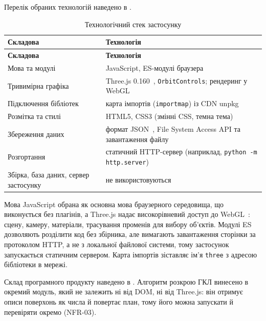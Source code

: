 
Перелік обраних технологій наведено в .

\begin{spacing}{1.15}
\small\noindent
\begin{xltabular}{\textwidth}{| >{\raggedright\arraybackslash}p{4.4cm} | >{\raggedright\arraybackslash}X |}
    \caption{Технологічний стек застосунку} \label{tab:stack} \\
    \hline
    \textbf{Складова} & \textbf{Технологія} \\ \hline
    \endfirsthead

    \hline
    \textbf{Складова} & \textbf{Технологія} \\ \hline
    \endhead

    Мова та модулі & JavaScript, ES-модулі браузера~ \\ \hline
    Тривимірна графіка & Three.js 0.160~, \texttt{OrbitControls}; рендеринг у WebGL~ \\ \hline
    Підключення бібліотек & карта імпортів (\texttt{importmap}) із CDN unpkg~ \\ \hline
    Розмітка та стилі & HTML5, CSS3 (змінні CSS, темна тема) \\ \hline
    Збереження даних & формат JSON~, File System Access API та завантаження файлу~ \\ \hline
    Розгортання & статичний HTTP-сервер (наприклад, \texttt{python -m http.server})~ \\ \hline
    Збірка, база даних, сервер застосунку & не використовуються \\ \hline
\end{xltabular}
\end{spacing}

Мова JavaScript обрана як основна мова браузерного середовища, що виконується без плагінів, а Three.js надає високорівневий доступ до WebGL~: сцену, камеру, матеріали, трасування променів для вибору об'єктів. Модулі ES дозволяють розділити код без збірника, але вимагають завантаження сторінки за протоколом HTTP, а не з локальної файлової системи, тому застосунок запускається статичним сервером. Карта імпортів зіставляє ім'я \texttt{three} з адресою бібліотеки в мережі.

Склад програмного продукту наведено в . Алгоритм розкрою ГКЛ винесено в окремий модуль, який не залежить ні від DOM, ні від Three.js: він отримує описи поверхонь як числа й повертає план, тому його можна запускати й перевіряти окремо (NFR-03).

